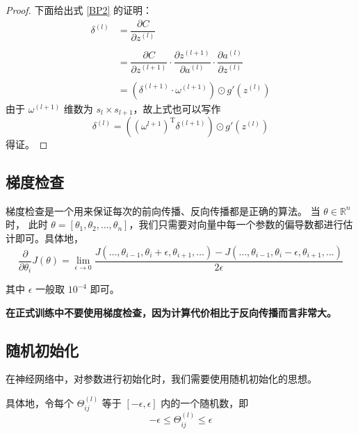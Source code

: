 \begin{proof}
   下面给出式 \ref{BP2} 的证明：
\begin{equation}
    \begin{aligned}
        \delta^{(l)} &= \dfrac{\partial C}{\partial z^{(l)}} \\
        \\
        &= \dfrac{\partial C}{\partial z^{(l+1)}} \cdot \dfrac{\partial z^{(l+1)}}{\partial a^{(l)}} \cdot \dfrac{\partial a^{(l)}}{\partial z^{(l)}} \\
        \\
        &= (\delta^{(l+1)} \cdot \omega^{(l+1)}) \odot g'\left(z^{(l)}\right)
    \end{aligned}
\end{equation}
由于 $\omega^{(l+1)}$ 维数为 $s_l \times s_{l+1}$，故上式也可以写作
\begin{equation}
    \delta^{(l)} = ((\omega^{l+1})^\mathrm{T}\delta^{(l+1)}) \odot g'\left(z^{(l)}\right)
\end{equation}
得证。 
\end{proof}

\subsection{梯度检查}

梯度检查是一个用来保证每次的前向传播、反向传播都是正确的算法。
当 $\theta \in \mathbb{R}^n$ 时，
此时 $\theta = \left[\theta_1, \theta_2, \dots, \theta_n\right]$，我们只需要对向量中每一个参数的偏导数都进行估计即可。具体地，
\begin{equation}
    \dfrac{\partial}{\partial \theta_i}J(\theta) = \lim\limits_{\epsilon \to 0} \dfrac{J(\dots, \theta_{i - 1}, \theta_i + \epsilon, \theta_{i+1}, \dots)
     - J(\dots, \theta_{i - 1}, \theta_i - \epsilon, \theta_{i+1}, \dots)}{2\epsilon}
\end{equation}

其中 $\epsilon$ 一般取 $10^{-4}$ 即可。

\textbf{在正式训练中不要使用梯度检查，因为计算代价相比于反向传播而言非常大。}

\subsection{随机初始化}
在神经网络中，对参数进行初始化时，我们需要使用随机初始化的思想。

具体地，令每个 $\Theta_{ij}^{(l)}$ 等于 $[-\epsilon, \epsilon]$ 内的一个随机数，即
\begin{equation}
    -\epsilon \leq \Theta_{ij}^{(l)} \leq \epsilon
\end{equation}

